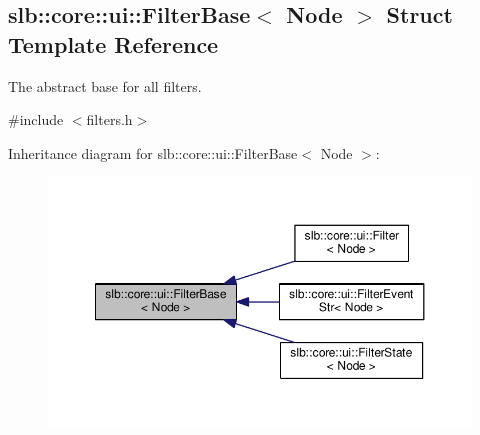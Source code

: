 \hypertarget{structslb_1_1core_1_1ui_1_1FilterBase}{}\subsection{slb\+:\+:core\+:\+:ui\+:\+:Filter\+Base$<$ Node $>$ Struct Template Reference}
\label{structslb_1_1core_1_1ui_1_1FilterBase}


The abstract base for all filters.  




{\ttfamily \#include $<$filters.\+h$>$}



Inheritance diagram for slb\+:\+:core\+:\+:ui\+:\+:Filter\+Base$<$ Node $>$\+:\nopagebreak
\begin{figure}[H]
\begin{center}
\leavevmode
\includegraphics[width=350pt]{structslb_1_1core_1_1ui_1_1FilterBase__inherit__graph}
\end{center}
\end{figure}
